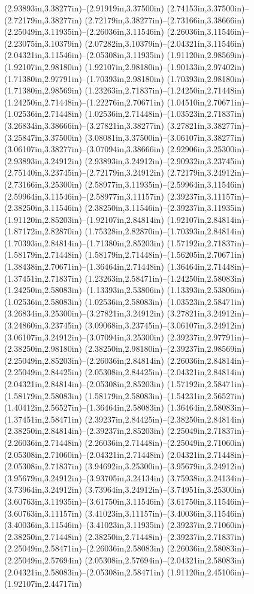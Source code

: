 (2.93893in,3.38277in)--(2.91919in,3.37500in) (2.74153in,3.37500in)--(2.72179in,3.38277in) (2.72179in,3.38277in)--(2.73166in,3.38666in) (2.25049in,3.11935in)--(2.26036in,3.11546in) (2.26036in,3.11546in)--(2.23075in,3.10379in) (2.07282in,3.10379in)--(2.04321in,3.11546in) (2.04321in,3.11546in)--(2.05308in,3.11935in) (1.91120in,2.98569in)--(1.92107in,2.98180in) (1.92107in,2.98180in)--(1.90133in,2.97402in) (1.71380in,2.97791in)--(1.70393in,2.98180in) (1.70393in,2.98180in)--(1.71380in,2.98569in) (1.23263in,2.71837in)--(1.24250in,2.71448in) (1.24250in,2.71448in)--(1.22276in,2.70671in) (1.04510in,2.70671in)--(1.02536in,2.71448in) (1.02536in,2.71448in)--(1.03523in,2.71837in) (3.26834in,3.38666in)--(3.27821in,3.38277in) (3.27821in,3.38277in)--(3.25847in,3.37500in) (3.08081in,3.37500in)--(3.06107in,3.38277in) (3.06107in,3.38277in)--(3.07094in,3.38666in) (2.92906in,3.25300in)--(2.93893in,3.24912in) (2.93893in,3.24912in)--(2.90932in,3.23745in) (2.75140in,3.23745in)--(2.72179in,3.24912in) (2.72179in,3.24912in)--(2.73166in,3.25300in) (2.58977in,3.11935in)--(2.59964in,3.11546in) (2.59964in,3.11546in)--(2.58977in,3.11157in) (2.39237in,3.11157in)--(2.38250in,3.11546in) (2.38250in,3.11546in)--(2.39237in,3.11935in) (1.91120in,2.85203in)--(1.92107in,2.84814in) (1.92107in,2.84814in)--(1.87172in,2.82870in) (1.75328in,2.82870in)--(1.70393in,2.84814in) (1.70393in,2.84814in)--(1.71380in,2.85203in) (1.57192in,2.71837in)--(1.58179in,2.71448in) (1.58179in,2.71448in)--(1.56205in,2.70671in) (1.38438in,2.70671in)--(1.36464in,2.71448in) (1.36464in,2.71448in)--(1.37451in,2.71837in) (1.23263in,2.58471in)--(1.24250in,2.58083in) (1.24250in,2.58083in)--(1.13393in,2.53806in) (1.13393in,2.53806in)--(1.02536in,2.58083in) (1.02536in,2.58083in)--(1.03523in,2.58471in) (3.26834in,3.25300in)--(3.27821in,3.24912in) (3.27821in,3.24912in)--(3.24860in,3.23745in) (3.09068in,3.23745in)--(3.06107in,3.24912in) (3.06107in,3.24912in)--(3.07094in,3.25300in) (2.39237in,2.97791in)--(2.38250in,2.98180in) (2.38250in,2.98180in)--(2.39237in,2.98569in) (2.25049in,2.85203in)--(2.26036in,2.84814in) (2.26036in,2.84814in)--(2.25049in,2.84425in) (2.05308in,2.84425in)--(2.04321in,2.84814in) (2.04321in,2.84814in)--(2.05308in,2.85203in) (1.57192in,2.58471in)--(1.58179in,2.58083in) (1.58179in,2.58083in)--(1.54231in,2.56527in) (1.40412in,2.56527in)--(1.36464in,2.58083in) (1.36464in,2.58083in)--(1.37451in,2.58471in) (2.39237in,2.84425in)--(2.38250in,2.84814in) (2.38250in,2.84814in)--(2.39237in,2.85203in) (2.25049in,2.71837in)--(2.26036in,2.71448in) (2.26036in,2.71448in)--(2.25049in,2.71060in) (2.05308in,2.71060in)--(2.04321in,2.71448in) (2.04321in,2.71448in)--(2.05308in,2.71837in) (3.94692in,3.25300in)--(3.95679in,3.24912in) (3.95679in,3.24912in)--(3.93705in,3.24134in) (3.75938in,3.24134in)--(3.73964in,3.24912in) (3.73964in,3.24912in)--(3.74951in,3.25300in) (3.60763in,3.11935in)--(3.61750in,3.11546in) (3.61750in,3.11546in)--(3.60763in,3.11157in) (3.41023in,3.11157in)--(3.40036in,3.11546in) (3.40036in,3.11546in)--(3.41023in,3.11935in) (2.39237in,2.71060in)--(2.38250in,2.71448in) (2.38250in,2.71448in)--(2.39237in,2.71837in) (2.25049in,2.58471in)--(2.26036in,2.58083in) (2.26036in,2.58083in)--(2.25049in,2.57694in) (2.05308in,2.57694in)--(2.04321in,2.58083in) (2.04321in,2.58083in)--(2.05308in,2.58471in) (1.91120in,2.45106in)--(1.92107in,2.44717in) 